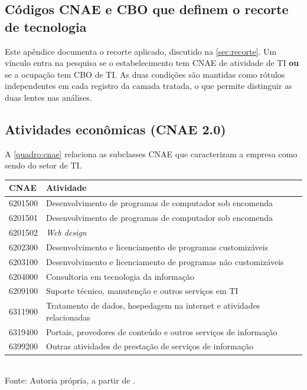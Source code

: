 
\begin{apendicesenv}

\chapter{Códigos CNAE e CBO que definem o recorte de tecnologia}
\label{apend:cbos}

Este apêndice documenta o recorte aplicado, discutido na \autoref{sec:recorte}. Um vínculo entra na pesquisa se o estabelecimento tem CNAE de atividade de TI \textbf{ou} se a ocupação tem CBO de TI. As duas condições são mantidas como rótulos independentes em cada registro da camada tratada, o que permite distinguir as duas lentes nas análises.

\section{Atividades econômicas (CNAE 2.0)}

A \autoref{quadro:cnae} relaciona as subclasses CNAE que caracterizam a empresa como sendo do setor de TI.

\begin{quadro}[H]
    \centering
    \caption{Subclasses CNAE que definem o setor de tecnologia}
    \label{quadro:cnae}
    \footnotesize
    \renewcommand{\arraystretch}{1.25}
    \begin{tabular}{lp{10.0cm}}
        \toprule
        \rowcolor{black!8}
        \textbf{CNAE} & \textbf{Atividade} \\
        \midrule
        6201500 & Desenvolvimento de programas de computador sob encomenda \\
        6201501 & Desenvolvimento de programas de computador sob encomenda \\
        6201502 & \textit{Web design} \\
        6202300 & Desenvolvimento e licenciamento de programas customizáveis \\
        6203100 & Desenvolvimento e licenciamento de programas não customizáveis \\
        6204000 & Consultoria em tecnologia da informação \\
        6209100 & Suporte técnico, manutenção e outros serviços em TI \\
        6311900 & Tratamento de dados, hospedagem na internet e atividades relacionadas \\
        6319400 & Portais, provedores de conteúdo e outros serviços de informação \\
        6399200 & Outras atividades de prestação de serviços de informação \\
        \bottomrule
    \end{tabular}
    \\[4pt]
    Fonte: Autoria própria, a partir de .
\end{quadro}


\end{apendicesenv}
